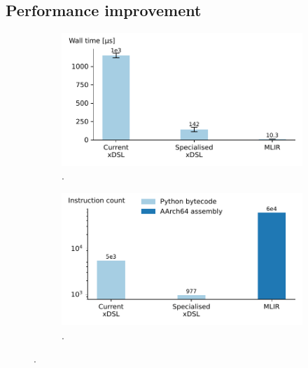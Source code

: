 

\subsection{Performance improvement}
\label{sec:specialising-pattern-rewriting-performance}


\begin{figure}[H]
    \centering
    \begin{subfigure}[b]{0.45\textwidth}
        \includegraphics[width=\textwidth]{images/specialising_optimising_xdsl_rewriting/constant_performance.pdf}
        \caption{.}
        \label{fig:constant-fold-performance}
    \end{subfigure}
    \hfill
    \begin{subfigure}[b]{0.45\textwidth}
        \includegraphics[width=\textwidth]{images/specialising_optimising_xdsl_rewriting/constant_instructions.pdf}
        \caption{.}
        \label{fig:constant-fold-instructions}
    \end{subfigure}
    \caption{.}
    \label{fig:constant-fold-summary}
\end{figure}

